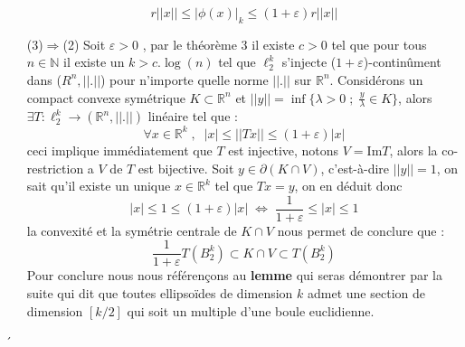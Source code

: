 \documentclass[12pt]{article}
\theoremstyle{definition}
\begin{document}
\begin{enumerate}
	\begin{equation*}
	r||x||\leq |\phi(x)|_k \leq (1+\varepsilon)r ||x||
	\end{equation*}
	\item[(3)$\Rightarrow$(2)]
	Soit $\varepsilon>0$ , par le théorème 3 il existe $c>0$ tel que pour tous $n\in\mathbb{N}$ il existe un $k>c.\log(n)$ tel que $\ell_2^k$ s'injecte ($1+\varepsilon$)-continûment dans ($R^n,||.||$) pour n’importe quelle norme $||.||$ sur $\mathbb{R}^n$. Considérons un compact convexe symétrique $K\subset \mathbb{R}^n$ et $||y||=\inf\Big\{\lambda>0\; ;\; \frac{y}{\lambda}\in K\Big\}$, alors $\exists T :\ell^{k}_2\to(\mathbb{R}^n,||.||)$ linéaire tel que :
	\begin{equation*}
	\forall x \in \mathbb{R}^k \; , \;\; |x|\leq ||Tx||\leq (1+\varepsilon)|x|
	\end{equation*}
	ceci implique immédiatement que $T$ est injective, notons $V=\text{Im}T$, alors la co-restriction a $V$ de $T$ est bijective.
	Soit $y\in \partial(K\cap V)$, c'est-à-dire $||y||=1$, on sait qu'il existe un unique $x\in\mathbb{R}^k$ tel que $Tx=y$, on en déduit donc 
	\begin{equation*}
	|x|\leq 1 \leq (1+\varepsilon)|x|\; \iff\; \frac{1}{1+\varepsilon}\leq|x|\leq 1
	\end{equation*}
	la convexité et la symétrie centrale de $K\cap V$ nous permet de conclure que  :
	\begin{equation*}
		\frac{1}{1+\varepsilon}T(B_2^k)\subset K\cap V \subset T(B_2^k)
	\end{equation*}
	Pour conclure nous nous référençons au \textbf{lemme } qui seras démontrer par la suite qui dit que toutes ellipsoïdes de dimension $k$ admet une section de dimension $[k/2]$ qui soit un multiple d'une boule euclidienne.  

\end{enumerate}


\newtheorem{lemme}[lemme]{Lemme}

\newtheorem{rem}[rem]{Remarque}
\newtheorem{proposition}[proposition]{Proposition}
´
\end{document}
